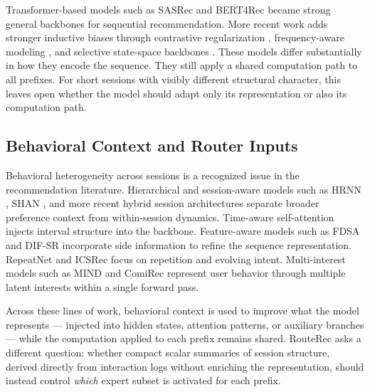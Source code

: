 \documentclass[sigconf,review,anonymous]{acmart}
\begin{document}
Transformer-based models such as SASRec \cite{kang2018sasrec} and BERT4Rec \cite{sun2019bert4rec} became strong general backbones for sequential recommendation. More recent work adds stronger inductive biases through contrastive regularization \cite{qiu2022duorec,hou2022core}, frequency-aware modeling \cite{du2023fearec,shin2024bsarec}, and selective state-space backbones \cite{liu2025sigma}. These models differ substantially in how they encode the sequence. They still apply a shared computation path to all prefixes. For short sessions with visibly different structural character, this leaves open whether the model should adapt only its representation or also its computation path.

\subsection{Behavioral Context and Router Inputs}
Behavioral heterogeneity across sessions is a recognized issue in the recommendation literature. Hierarchical and session-aware models such as HRNN \cite{quadrana2017hrnn}, SHAN \cite{ying2018shan}, and more recent hybrid session architectures \cite{bauer2024hybridsession} separate broader preference context from within-session dynamics. Time-aware self-attention \cite{li2020tisasrec} injects interval structure into the backbone. Feature-aware models such as FDSA \cite{zhang2019fdsa} and DIF-SR \cite{xie2022difsr} incorporate side information to refine the sequence representation. RepeatNet \cite{ren2019repeatnet} and ICSRec \cite{qin2024icsrec} focus on repetition and evolving intent. Multi-interest models such as MIND \cite{li2019mind} and ComiRec \cite{cen2020comirec} represent user behavior through multiple latent interests within a single forward pass.

Across these lines of work, behavioral context is used to improve what the model represents — injected into hidden states, attention patterns, or auxiliary branches — while the computation applied to each prefix remains shared. RouteRec asks a different question: whether compact scalar summaries of session structure, derived directly from interaction logs without enriching the representation, should instead control \emph{which} expert subset is activated for each prefix.
\end{document}
